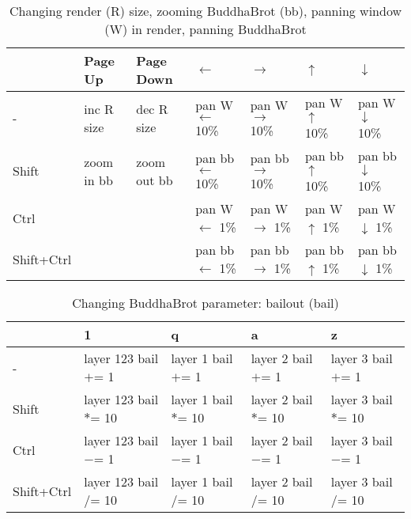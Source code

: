 \documentclass[10pt,a4paper]{article}
\begin{document}
\begin{table}[h!]
    \caption{Changing render (R) size, zooming BuddhaBrot (bb), panning window (W) in render, panning BuddhaBrot}
    \setlength{\tabcolsep}{0.0pt}
    \begin{tabularx}{\linewidth}{LLLLLLL}
        \toprule
                   & Page Up    & Page Down   & $\leftarrow$             & $\rightarrow$              & $\uparrow$             & $\downarrow$             \\
        \midrule                                                                                                                                                 
        -          & inc R size & dec R size  & pan W $\leftarrow$ 10\%  & pan W  $\rightarrow$ 10\%  & pan W $\uparrow$ 10\%  & pan W $\downarrow$ 10\%  \\
        Shift      & zoom in bb & zoom out bb & pan bb $\leftarrow$ 10\% & pan bb  $\rightarrow$ 10\% & pan bb $\uparrow$ 10\% & pan bb $\downarrow$ 10\% \\
        Ctrl       &            &             & pan W $\leftarrow$ 1\%   & pan W  $\rightarrow$ 1\%   & pan W $\uparrow$ 1\%   & pan W $\downarrow$ 1\%   \\
        Shift+Ctrl &            &             & pan bb $\leftarrow$ 1\%  & pan bb  $\rightarrow$ 1\%  & pan bb $\uparrow$ 1\%  & pan bb $\downarrow$ 1\%  \\
        \bottomrule
    \end{tabularx}
\end{table}

\begin{table}[h!]
    \caption{Changing BuddhaBrot parameter: bailout (bail)}
    \setlength{\tabcolsep}{0.0pt}
    \begin{tabularx}{\linewidth}{LLLLL}
        \toprule
                   & 1                      & q                    & a                    & z                    \\
        \midrule                                                                          
        -          & layer 123 bail $+$= 1  & layer 1 bail $+$= 1  & layer 2 bail $+$= 1  & layer 3 bail $+$= 1  \\
        Shift      & layer 123 bail $*$= 10 & layer 1 bail $*$= 10 & layer 2 bail $*$= 10 & layer 3 bail $*$= 10 \\
        Ctrl       & layer 123 bail $-$= 1  & layer 1 bail $-$= 1  & layer 2 bail $-$= 1  & layer 3 bail $-$= 1  \\
        Shift+Ctrl & layer 123 bail $/$= 10 & layer 1 bail $/$= 10 & layer 2 bail $/$= 10 & layer 3 bail $/$= 10 \\
        \bottomrule
    \end{tabularx}
\end{table}
\end{document}
